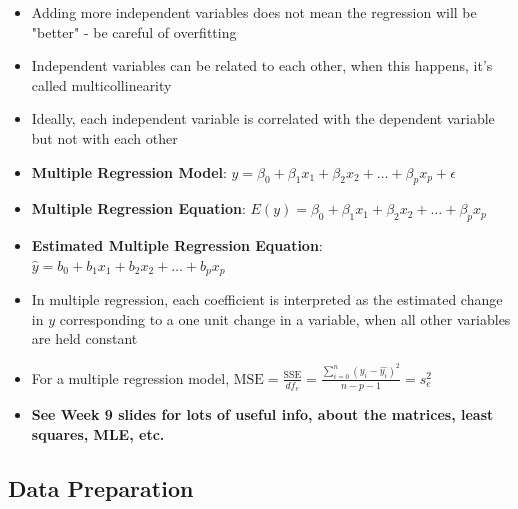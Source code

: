 \documentclass{article}
\begin{document}
\begin{itemize}
    \item Adding more independent variables does not mean the regression will be "better" - be careful of overfitting
    \item Independent variables can be related to each other, when this happens, it's called multicollinearity
    \item Ideally, each independent variable is correlated with the dependent variable but not with each other
    \item \textbf{Multiple Regression Model}: $y=\beta_0 + \beta_1 x_1 + \beta_2 x_2 + \dots + \beta_p x_p + \epsilon$
    \item \textbf{Multiple Regression Equation}: $E(y)=\beta_0 + \beta_1 x_1 + \beta_2 x_2 + \dots + \beta_p x_p$
    \item \textbf{Estimated Multiple Regression Equation}: $\hat{y}=b_0 + b_1 x_1 + b_2 x_2 + \dots + b_p x_p$
    \item In multiple regression, each coefficient is interpreted as the estimated change in $y$ corresponding to a one unit change in a variable, when all other variables are held constant
    \item For a multiple regression model, $\text{MSE}=\frac{\text{SSE}}{df_e}=\frac{\sum_{i=0}^{n}(y_i-\hat{y_i})^2}{n-p-1}=s_e^2$
    \item \textbf{See Week 9 slides for lots of useful info, about the matrices, least squares, MLE, etc.}
\end{itemize}

\subsection{Data Preparation}
\end{document}
